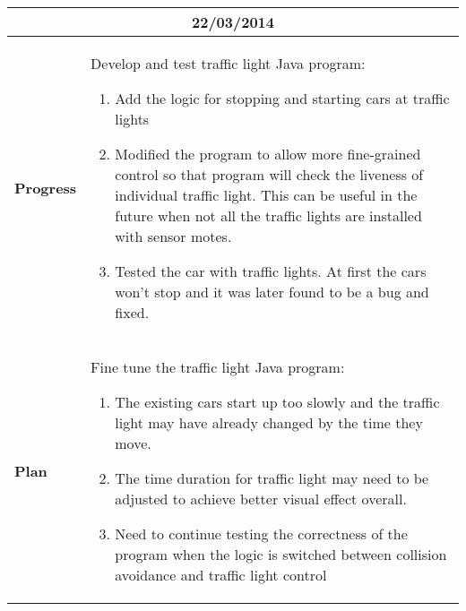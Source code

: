 \begin{center}
\begin{longtable}{ | p{2cm} | p{10cm} | }
                \multicolumn{2}{|c|}{\textbf{22/03/2014}} \\ \hline
                \textbf{Progress} & Develop and test traffic light Java program:
                \begin{enumerate}
                  \item Add the logic for stopping and starting cars at traffic lights
                  \item Modified the program to allow more fine-grained control so that program will check the liveness of individual traffic light. This can be useful in the future when not all the traffic lights are installed with sensor motes.
                  \item Tested the car with traffic lights. At first the cars won't stop and it was later found to be a bug and fixed.
                \end{enumerate}  \\ \hline
                \textbf{Plan} & Fine tune the traffic light Java program:
                \begin{enumerate}
                  \item The existing cars start up too slowly and the traffic light may have already changed by the time they move.
                  \item The time duration for traffic light may need to be adjusted to achieve better visual effect overall.
                  \item Need to continue testing the correctness of the program when the logic is switched between collision avoidance and traffic light control
                \end{enumerate}  \\ \hline


\end{longtable}
\end{center}

